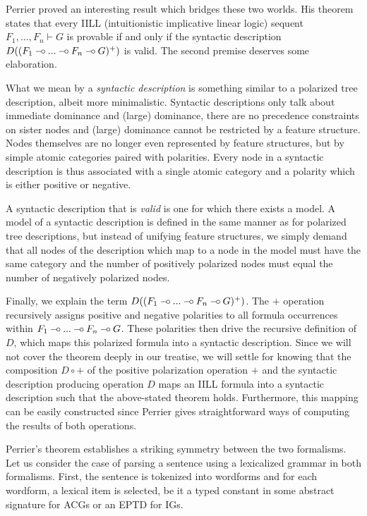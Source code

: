 Perrier \cite{perrier1999intuitionistic} proved an interesting result
which bridges these two worlds. His theorem states that every IILL
(intuitionistic implicative linear logic) sequent $F_1, ..., F_n \vdash
G$ is provable if and only if the syntactic description $D((F_1 \mathbin{{-}\mkern-3.5mu{\circ}}
... \mathbin{{-}\mkern-3.5mu{\circ}} F_n \mathbin{{-}\mkern-3.5mu{\circ}} G)^+)$ is valid. The second premise deserves some
elaboration.

What we mean by a \emph{syntactic description} is something similar to a
polarized tree description, albeit more minimalistic. Syntactic
descriptions only talk about immediate dominance and (large) dominance,
there are no precedence constraints on sister nodes and (large)
dominance cannot be restricted by a feature structure. Nodes themselves
are no longer even represented by feature structures, but by simple
atomic categories paired with polarities. Every node in a syntactic
description is thus associated with a single atomic category and a
polarity which is either positive or negative.

A syntactic description that is \emph{valid} is one for which there
exists a model. A model of a syntactic description is defined in the
same manner as for polarized tree descriptions, but instead of unifying
feature structures, we simply demand that all nodes of the description
which map to a node in the model must have the same category and the
number of positively polarized nodes must equal the number of negatively
polarized nodes.

Finally, we explain the term $D((F_1 \mathbin{{-}\mkern-3.5mu{\circ}} ... \mathbin{{-}\mkern-3.5mu{\circ}} F_n \mathbin{{-}\mkern-3.5mu{\circ}}
G)^+)$. The $+$ operation recursively assigns positive and negative
polarities to all formula occurrences within $F_1 \mathbin{{-}\mkern-3.5mu{\circ}} ... \mathbin{{-}\mkern-3.5mu{\circ}} F_n
\mathbin{{-}\mkern-3.5mu{\circ}} G$. These polarities then drive the recursive definition of $D$,
which maps this polarized formula into a syntactic description. Since we
will not cover the theorem deeply in our treatise, we will settle for
knowing that the composition $D \circ +$ of the positive polarization
operation $+$ and the syntactic description producing operation $D$ maps
an IILL formula into a syntactic description such that the above-stated
theorem holds. Furthermore, this mapping can be easily constructed since
Perrier gives straightforward ways of computing the results of both
operations.

Perrier's theorem establishes a striking symmetry between the two
formalisms. Let us consider the case of parsing a sentence using a
lexicalized grammar in both formalisms. First, the sentence is tokenized
into wordforms and for each wordform, a lexical item is selected, be it
a typed constant in some abstract signature for ACGs or an EPTD for IGs.

